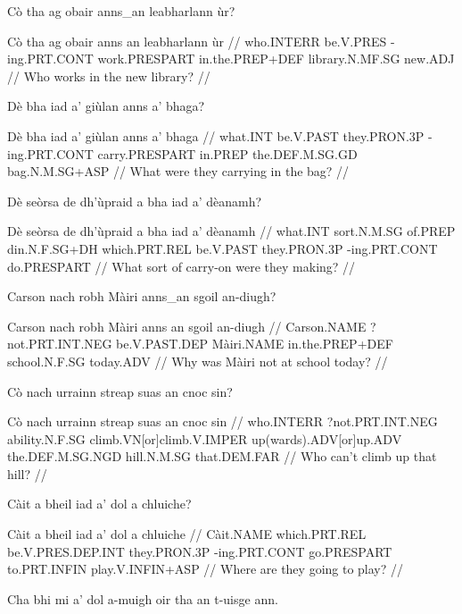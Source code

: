 \documentclass[a4paper,10pt]{article}
\begin{document}
\ex
\begingl
\glpre Cò tha ag obair anns\_an leabharlann ùr? 

\vspace{4mm}
\gla Cò tha ag obair {anns an} leabharlann ùr  //
\glb who.INTERR be.V.PRES -ing.PRT.CONT work.PRESPART in.the.PREP+DEF library.N.MF.SG new.ADJ  //
\glft Who works in the new library? //
\endgl
\xe

\ex
\begingl
\glpre Dè bha iad a' giùlan anns a' bhaga? 

\vspace{4mm}
\gla Dè bha iad a' giùlan anns a' bhaga  //
\glb what.INT be.V.PAST they.PRON.3P -ing.PRT.CONT carry.PRESPART in.PREP the.DEF.M.SG.GD bag.N.M.SG+ASP  //
\glft What were they carrying in the bag? //
\endgl
\xe

\ex
\begingl
\glpre Dè seòrsa de dh'ùpraid a bha iad a' dèanamh? 

\vspace{4mm}
\gla Dè seòrsa de dh'ùpraid a bha iad a' dèanamh  //
\glb what.INT sort.N.M.SG of.PREP din.N.F.SG+DH which.PRT.REL be.V.PAST they.PRON.3P -ing.PRT.CONT do.PRESPART  //
\glft What sort of carry-on were they making? //
\endgl
\xe

\ex
\begingl
\glpre Carson nach robh Màiri anns\_an sgoil an-diugh? 

\vspace{4mm}
\gla Carson nach robh Màiri {anns an} sgoil an-diugh  //
\glb Carson.NAME ?not.PRT.INT.NEG be.V.PAST.DEP Màiri.NAME in.the.PREP+DEF school.N.F.SG today.ADV  //
\glft Why was Màiri not at school today? //
\endgl
\xe

\ex
\begingl
\glpre Cò nach urrainn streap suas an cnoc sin? 

\vspace{4mm}
\gla Cò nach urrainn streap suas an cnoc sin  //
\glb who.INTERR ?not.PRT.INT.NEG ability.N.F.SG climb.VN[or]climb.V.IMPER up(wards).ADV[or]up.ADV the.DEF.M.SG.NGD hill.N.M.SG that.DEM.FAR  //
\glft Who can't climb up that hill? //
\endgl
\xe

\ex
\begingl
\glpre Càit a bheil iad a' dol a chluiche? 

\vspace{4mm}
\gla Càit a bheil iad a' dol a chluiche  //
\glb Càit.NAME which.PRT.REL be.V.PRES.DEP.INT they.PRON.3P -ing.PRT.CONT go.PRESPART to.PRT.INFIN play.V.INFIN+ASP  //
\glft Where are they going to play? //
\endgl
\xe

\ex
\begingl
\glpre Cha bhi mi a' dol a-muigh oir tha an t-uisge ann. 
\end{document}

